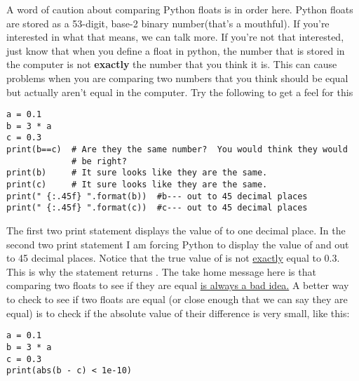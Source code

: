 A word of caution about comparing Python floats is in order here.
Python floats are stored as a 53-digit, base-2 binary number(that's a
mouthful).  If you're interested in what that means, we can talk more.
If you're not that interested, just know that when you define a float
in python, the number that is stored in the computer is not
\textbf{exactly} the number that you think it is.  This can cause
problems when you are comparing two numbers that you think should be
equal but actually aren't equal in the computer.   Try the following to get a feel for this
\begin{Verbatim}
a = 0.1
b = 3 * a
c = 0.3
print(b==c)  # Are they the same number?  You would think they would
             # be right?
print(b)     # It sure looks like they are the same.
print(c)     # It sure looks like they are the same.
print(" {:.45f} ".format(b))  #b--- out to 45 decimal places
print(" {:.45f} ".format(c))  #c--- out to 45 decimal places
\end{Verbatim}
The first two print statement displays the value of  to one
decimal place. In the second two print statement I am forcing Python
to display the value of  and  out to 45 decimal
places.  Notice that the true value of  is not \ul{exactly}
equal to 0.3.  This is why the statement  returns
. The take home message here is that comparing two floats
to see if they are equal \ul{is always a bad idea.}  A better way to
check to see if two floats are equal (or close enough that we can say
they are equal) is to check if the absolute value of their difference
is very small, like this:
\begin{Verbatim}
a = 0.1
b = 3 * a
c = 0.3
print(abs(b - c) < 1e-10)
\end{Verbatim}
